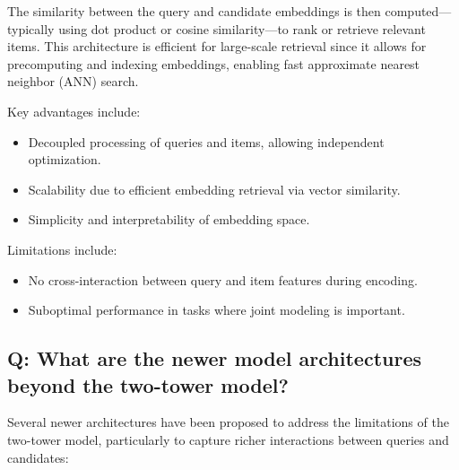 The similarity between the query and candidate embeddings is then computed—typically using dot product or cosine similarity—to rank or retrieve relevant items. This architecture is efficient for large-scale retrieval since it allows for precomputing and indexing embeddings, enabling fast approximate nearest neighbor (ANN) search.

Key advantages include:
\begin{itemize}
	\item Decoupled processing of queries and items, allowing independent optimization.
	\item Scalability due to efficient embedding retrieval via vector similarity.
	\item Simplicity and interpretability of embedding space.
\end{itemize}

Limitations include:
\begin{itemize}
	\item No cross-interaction between query and item features during encoding.
	\item Suboptimal performance in tasks where joint modeling is important.
\end{itemize}

\subsection*{Q: What are the newer model architectures beyond the two-tower model?}
Several newer architectures have been proposed to address the limitations of the two-tower model, particularly to capture richer interactions between queries and candidates:

